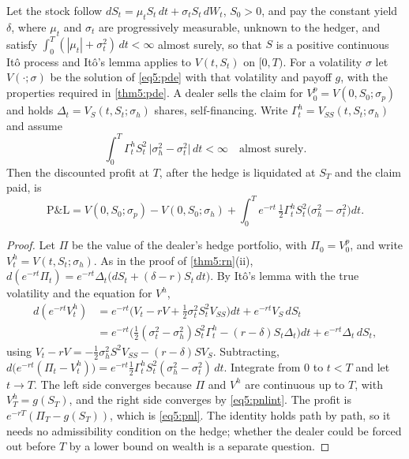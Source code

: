 \begin{chapterrefs}
\begin{theorem}\label{thm5:pnl}
Let the stock follow $dS_t=\mu_tS_t\,dt+\sigma_tS_t\,dW_t$, $S_0>0$, and pay the constant yield $\delta$,
where $\mu_t$ and $\sigma_t$ are progressively measurable, unknown to the hedger, and satisfy
$\int_0^T(|\mu_t|+\sigma_t^2)\,dt<\infty$ almost surely, so that $S$ is a positive continuous It\^o
process and It\^o's lemma applies to $V(t,S_t)$ on $[0,T)$. For a volatility $\sigma$ let $V(\cdot;\sigma)$ be the
solution of \cref{eq5:pde} with that volatility and payoff $g$, with the properties required in
\cref{thm5:pde}. A dealer sells the claim for $V^p_0=V(0,S_0;\sigma_p)$ and holds
$\Delta_t=V_S(t,S_t;\sigma_h)$ shares, self-financing. Write $\Gamma^h_t=V_{SS}(t,S_t;\sigma_h)$ and
assume
\begin{equation}\label{eq5:pnlint}
  \int_0^T\Gamma^h_tS_t^2\,\bigl|\sigma_h^2-\sigma_t^2\bigr|\,dt<\infty\quad\text{almost surely.}
\end{equation}
Then the discounted profit at $T$, after the hedge is liquidated at $S_T$ and the claim paid, is
\begin{equation}\label{eq5:pnl}
  \mathrm{P\&L}=V(0,S_0;\sigma_p)-V(0,S_0;\sigma_h)+\int_0^Te^{-rt}\,\tfrac12\Gamma^h_tS_t^2\bigl(\sigma_h^2-\sigma_t^2\bigr)dt .
\end{equation}
\end{theorem}

\begin{proof}
Let $\Pi$ be the value of the dealer's hedge portfolio, with $\Pi_0=V^p_0$, and write $V^h_t=V(t,S_t;\sigma_h)$.
As in the proof of \cref{thm5:rn}(ii), $d(e^{-rt}\Pi_t)=e^{-rt}\Delta_t\bigl(dS_t+(\delta-r)S_t\,dt\bigr)$. By
It\^o's lemma with the true volatility and the equation for $V^h$,
\begin{equation*}
\begin{aligned}
  d(e^{-rt}V^h_t)&=e^{-rt}\bigl(V_t-rV+\tfrac12\sigma_t^2S_t^2V_{SS}\bigr)dt+e^{-rt}V_S\,dS_t\\
  &=e^{-rt}\bigl(\tfrac12(\sigma_t^2-\sigma_h^2)S_t^2\Gamma^h_t-(r-\delta)S_t\Delta_t\bigr)dt+e^{-rt}\Delta_t\,dS_t ,
\end{aligned}
\end{equation*}
using $V_t-rV=-\tfrac12\sigma_h^2S^2V_{SS}-(r-\delta)SV_S$. Subtracting,
$d\bigl(e^{-rt}(\Pi_t-V^h_t)\bigr)=e^{-rt}\tfrac12\Gamma^h_tS_t^2(\sigma_h^2-\sigma_t^2)\,dt$. Integrate from
$0$ to $t<T$ and let $t\to T$. The left side converges because $\Pi$ and $V^h$ are continuous up to
$T$, with $V^h_T=g(S_T)$, and the right side converges by \cref{eq5:pnlint}. The profit is
$e^{-rT}(\Pi_T-g(S_T))$, which is \cref{eq5:pnl}. The identity holds path by path, so it needs no
admissibility condition on the hedge; whether the dealer could be forced out before $T$ by a lower
bound on wealth is a separate question.
\end{proof}


\end{chapterrefs}
